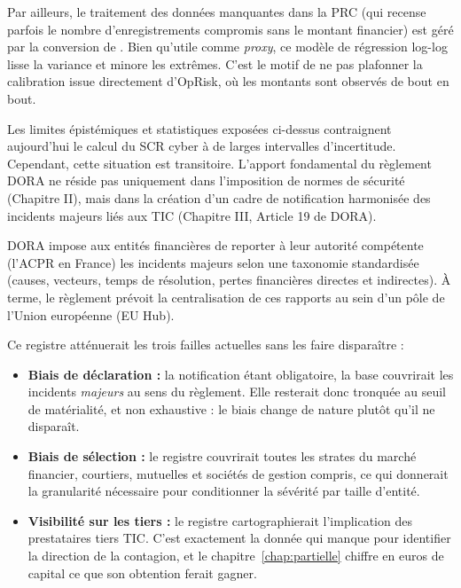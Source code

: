 Par ailleurs, le traitement des données manquantes dans la PRC (qui recense parfois le nombre d'enregistrements compromis sans le montant financier) est géré par la conversion de \citet{jacobs2014}. Bien qu'utile comme \emph{proxy}, ce modèle de régression log-log lisse la variance et minore les extrêmes. C'est le motif de
ne pas plafonner la calibration issue directement d'OpRisk, où les montants sont observés de
bout en bout.



Les limites épistémiques et statistiques exposées ci-dessus contraignent aujourd'hui le calcul du SCR cyber à de larges intervalles d'incertitude. Cependant, cette situation est transitoire. L'apport fondamental du règlement DORA ne réside pas uniquement dans l'imposition de normes de sécurité (Chapitre II), mais dans la création d'un cadre de notification harmonisée des incidents majeurs liés aux TIC (Chapitre III, Article 19 de DORA).

DORA impose aux entités financières de reporter à leur autorité compétente (l'ACPR en France) les incidents majeurs selon une taxonomie standardisée (causes, vecteurs, temps de résolution, pertes financières directes et indirectes). À terme, le règlement prévoit la centralisation de ces rapports au sein d'un pôle de l'Union européenne (EU Hub).

Ce registre atténuerait les trois failles actuelles sans les faire disparaître :
\begin{itemize}
    \item \textbf{Biais de déclaration :} la notification étant obligatoire, la base couvrirait
      les incidents \emph{majeurs} au sens du règlement. Elle resterait donc tronquée au seuil
      de matérialité, et non exhaustive : le biais change de nature plutôt qu'il ne disparaît.
    \item \textbf{Biais de sélection :} le registre couvrirait toutes les strates du marché
      financier, courtiers, mutuelles et sociétés de gestion compris, ce qui donnerait la
      granularité nécessaire pour conditionner la sévérité par taille d'entité.
    \item \textbf{Visibilité sur les tiers :} le registre cartographierait l'implication des
      prestataires tiers TIC. C'est exactement la donnée qui manque pour identifier la direction
      de la contagion, et le chapitre~\ref{chap:partielle} chiffre en euros de capital ce que
      son obtention ferait gagner.
\end{itemize}

